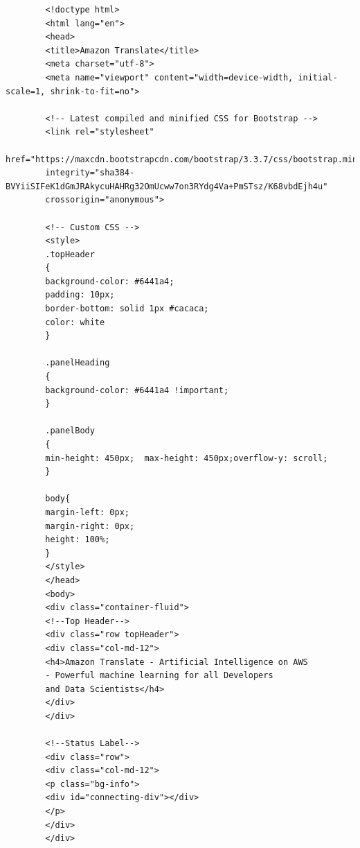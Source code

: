 \documentclass[english,runningheads,a4paper]{llncs}[2018/03/10]
\begin{document}
    \small{
        \begin{verbatim}
        <!doctype html>
        <html lang="en">
        <head>
        <title>Amazon Translate</title>
        <meta charset="utf-8">
        <meta name="viewport" content="width=device-width, initial-scale=1, shrink-to-fit=no">
        
        <!-- Latest compiled and minified CSS for Bootstrap -->
        <link rel="stylesheet"
        href="https://maxcdn.bootstrapcdn.com/bootstrap/3.3.7/css/bootstrap.min.css"
        integrity="sha384-BVYiiSIFeK1dGmJRAkycuHAHRg32OmUcww7on3RYdg4Va+PmSTsz/K68vbdEjh4u" 
        crossorigin="anonymous">
        
        <!-- Custom CSS -->
        <style>
        .topHeader
        {
        background-color: #6441a4;
        padding: 10px;
        border-bottom: solid 1px #cacaca;
        color: white
        }
        
        .panelHeading
        {
        background-color: #6441a4 !important;
        }
        
        .panelBody
        {
        min-height: 450px;  max-height: 450px;overflow-y: scroll;
        }
        
        body{
        margin-left: 0px;
        margin-right: 0px;
        height: 100%;
        }
        </style>
        </head>
        <body>
        <div class="container-fluid">
        <!--Top Header-->
        <div class="row topHeader">
        <div class="col-md-12">
        <h4>Amazon Translate - Artificial Intelligence on AWS
        - Powerful machine learning for all Developers 
        and Data Scientists</h4>
        </div>
        </div>
        
        <!--Status Label-->
        <div class="row">
        <div class="col-md-12">
        <p class="bg-info">
        <div id="connecting-div"></div>
        </p>
        </div>
        </div>
        

\end{verbatim}}
\end{document}
